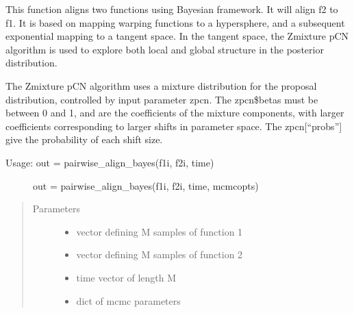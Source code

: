 \documentclass[letterpaper,10pt,english]{sphinxmanual}
\begin{document}

\begin{fulllineitems}
\label{\detokenize{time_warping:time_warping.pairwise_align_bayes}}
This function aligns two functions using Bayesian framework. It will align
f2 to f1. It is based on mapping warping functions to a hypersphere, and a
subsequent exponential mapping to a tangent space. In the tangent space,
the Z\sphinxhyphen{}mixture pCN algorithm is used to explore both local and global
structure in the posterior distribution.

The Z\sphinxhyphen{}mixture pCN algorithm uses a mixture distribution for the proposal
distribution, controlled by input parameter zpcn. The zpcn\$betas must be
between 0 and 1, and are the coefficients of the mixture components, with
larger coefficients corresponding to larger shifts in parameter space. The
zpcn{[}“probs”{]} give the probability of each shift size.
\begin{description}
\item[{Usage:  out = pairwise\_align\_bayes(f1i, f2i, time)}] \leavevmode
out = pairwise\_align\_bayes(f1i, f2i, time, mcmcopts)

\end{description}
\begin{quote}\begin{description}
\item[{Parameters}] \leavevmode\begin{itemize}
\item {} 
 \textendash{} vector defining M samples of function 1

\item {} 
 \textendash{} vector defining M samples of function 2

\item {} 
 \textendash{} time vector of length M

\item {} 
 \textendash{} dict of mcmc parameters


\end{itemize}
\end{description}
\end{quote}
\end{fulllineitems}
\end{document}
